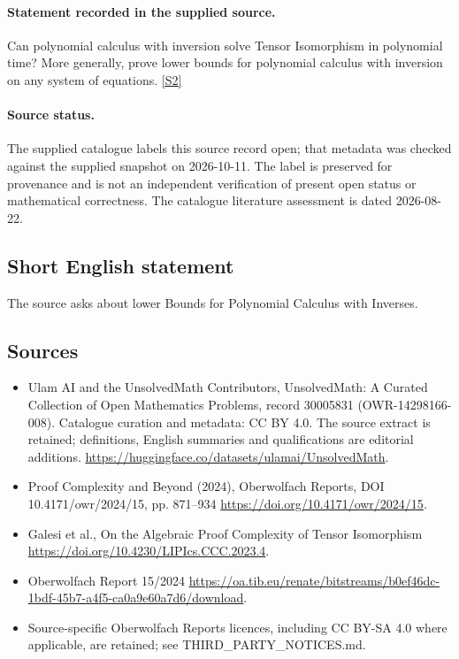 \documentclass[11pt]{article}
\begin{document}
\paragraph{Statement recorded in the supplied source.}
Can polynomial calculus with inversion solve Tensor Isomorphism in polynomial time? More generally, prove lower bounds for polynomial calculus with inversion on any system of equations. \href{https://doi.org/10.4171/owr/2024/15}{[S2]}
\paragraph{Source status.}
The supplied catalogue labels this source record open; that metadata was checked against the supplied snapshot on 2026-10-11. The label is preserved for provenance and is not an independent verification of present open status or mathematical correctness. The catalogue literature assessment is dated 2026-08-22.
\subsection{Short English statement}
The source asks about lower Bounds for Polynomial Calculus with Inverses.
\subsection{Sources}
\begin{itemize}
\item[S1] Ulam AI and the UnsolvedMath Contributors, UnsolvedMath: A Curated Collection of Open Mathematics Problems, record 30005831 (OWR-14298166-008). Catalogue curation and metadata: CC BY 4.0. The source extract is retained; definitions, English summaries and qualifications are editorial additions.
\url{https://huggingface.co/datasets/ulamai/UnsolvedMath}.
\item[S2] Proof Complexity and Beyond (2024), Oberwolfach Reports, DOI 10.4171/owr/2024/15, pp. 871--934
\url{https://doi.org/10.4171/owr/2024/15}.
\item[S3] Galesi et al., On the Algebraic Proof Complexity of Tensor Isomorphism
\url{https://doi.org/10.4230/LIPIcs.CCC.2023.4}.
\item[S4] Oberwolfach Report 15/2024
\url{https://oa.tib.eu/renate/bitstreams/b0ef46dc-1bdf-45b7-a4f5-ca0a9e60a7d6/download}.
\item Source-specific Oberwolfach Reports licences, including CC BY-SA 4.0 where applicable, are retained; see THIRD\_PARTY\_NOTICES.md.
\end{itemize}
\end{document}
